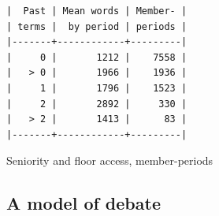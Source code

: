 \documentclass[letter,12pt]{article}
\begin{document}
\begin{table}
  \begin{scriptsize}
    \begin{verbatim}
|  Past | Mean words | Member- |
| terms |  by period | periods |
|-------+------------+---------|
|     0 |       1212 |    7558 |
|   > 0 |       1966 |    1936 |
|     1 |       1796 |    1523 |
|     2 |       2892 |     330 |
|   > 2 |       1413 |      83 |
|-------+------------+---------|
    \end{verbatim}
  \end{scriptsize}
\caption{Seniority and floor access, member-periods}
\end{table}
  
  \subsection{A model of debate}




\end{document}
